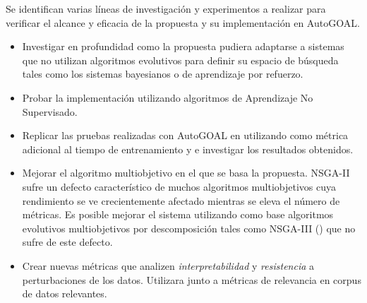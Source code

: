 \begin{recomendations}
Se identifican varias l\'ineas de investigaci\'on y experimentos a realizar para verificar el alcance y eficacia de la propuesta y su implementaci\'on en AutoGOAL.
\begin{itemize}
    \item Investigar en profundidad  como la propuesta pudiera adaptarse a sistemas que no utilizan algoritmos evolutivos para definir su espacio de b\'usqueda tales como los sistemas bayesianos o de aprendizaje por refuerzo.
    \item Probar la implementaci\'on utilizando algoritmos de Aprendizaje No Supervisado.
    \item Replicar las pruebas realizadas con AutoGOAL en \cite{estevez2020solving} utilizando como m\'etrica adicional al tiempo de entrenamiento y e investigar los resultados obtenidos. 
    \item Mejorar el algoritmo multiobjetivo en el que se basa la propuesta. NSGA-II sufre un defecto caracter\'istico de muchos algoritmos multiobjetivos cuya rendimiento se ve crecientemente afectado mientras se eleva el n\'umero de m\'etricas. Es posible mejorar el sistema utilizando como base algoritmos evolutivos multiobjetivos por descomposici\'on tales como NSGA-III (\cite{deb2013evolutionary}) que no sufre de este defecto.
    
    \item Crear nuevas m\'etricas que analizen \textit{interpretabilidad} y \textit{resistencia} a perturbaciones de los datos. Utilizara junto a m\'etricas de relevancia en corpus de datos relevantes.
\end{itemize}

\end{recomendations}
